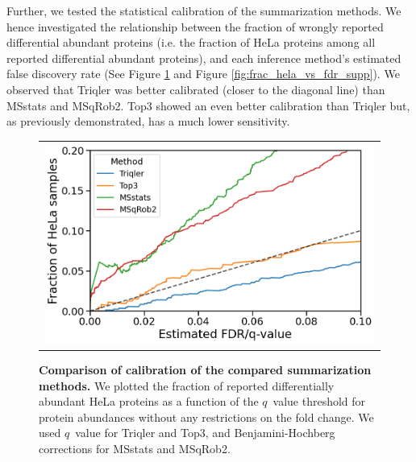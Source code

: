 \documentclass[10pt,letterpaper]{article}
\begin{document}
Further, we tested the statistical calibration of the summarization methods. We hence investigated the relationship between the fraction of wrongly reported differential abundant proteins (i.e. the fraction of HeLa proteins among all reported differential abundant proteins), and each inference method's estimated false discovery rate (See Figure \ref{fig:frac_hela_vs_fdr} and Figure \ref{fig:frac_hela_vs_fdr_supp}). We observed that Triqler was better calibrated (closer to the diagonal line) than MSstats and MSqRob2. Top3 showed an even better calibration than Triqler but, as previously demonstrated, has a much lower sensitivity.



\begin{figure}[hbt]
    \centering
    \begin{tabular}{c} 
        \includegraphics[width=0.5\linewidth]{../../result/report_plots_pipeline/calibration_ID_0.png}
    \end{tabular}
  \caption{{\bf Comparison of calibration of the compared summarization methods.} We plotted the fraction of reported differentially abundant HeLa proteins as a function of the $q$~value threshold for protein abundances without any restrictions on the fold change. We used $q$~value for Triqler and Top3, and Benjamini-Hochberg corrections for MSstats and MSqRob2. \label{fig:frac_hela_vs_fdr}}
\end{figure}

\end{document}
